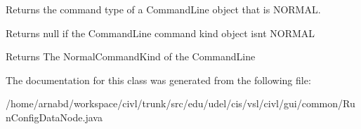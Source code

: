 Returns the command type of a Command\+Line object that is N\+O\+R\+M\+A\+L. 

Returns null if the Command\+Line command kind object isn\textquotesingle{}t N\+O\+R\+M\+A\+L

\begin{DoxyReturn}{Returns}
The Normal\+Command\+Kind of the Command\+Line 
\end{DoxyReturn}


The documentation for this class was generated from the following file\+:\begin{DoxyCompactItemize}
\item 
/home/arnabd/workspace/civl/trunk/src/edu/udel/cis/vsl/civl/gui/common/Run\+Config\+Data\+Node.\+java\end{DoxyCompactItemize}
